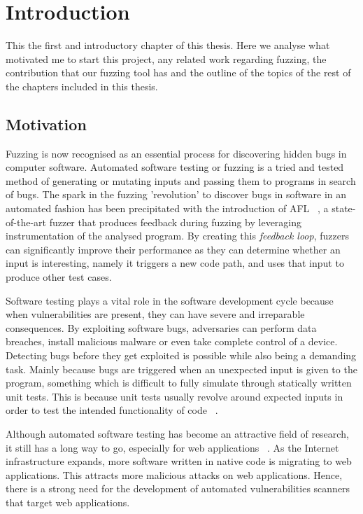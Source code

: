 \chapter{Introduction}
\minitoc
\vspace*{1cm}

This the first and introductory chapter of this thesis. Here we analyse what motivated me to start this project, any related work regarding fuzzing, the contribution that our fuzzing tool has and the outline of the topics of the rest of the chapters included in this thesis.

\section{Motivation}
Fuzzing is now recognised as an essential process for discovering hidden bugs in computer software. Automated software testing or fuzzing is a tried and tested method of generating or mutating inputs and passing them to programs in search of bugs. The spark in the fuzzing 'revolution' to discover bugs in software in an automated fashion has been precipitated with the introduction of AFL ~\cite{zalewski2015american}, a state-of-the-art fuzzer that produces feedback during fuzzing by leveraging instrumentation of the analysed program. By creating this \textit{feedback loop}, fuzzers can significantly improve their performance as they can determine whether an input is interesting, namely it triggers a new code path, and uses that input to produce other test cases.

Software testing plays a vital role in the software development cycle because when vulnerabilities are present, they can have severe and irreparable consequences. By exploiting software bugs, adversaries can perform data breaches, install malicious malware or even take complete control of a device. Detecting bugs before they get exploited is possible while also being a demanding task. Mainly because bugs are triggered when an unexpected input is given to the program, something which is difficult to fully simulate through statically written unit tests. This is because unit tests usually revolve around expected inputs in order to test the intended functionality of code ~\cite{aschermann2019nautilus}.

Although automated software testing has become an attractive field of research, it still has a long way to go, especially for web applications ~\cite{doupe2010johnny}. As the Internet infrastructure expands, more software written in native code is migrating to web applications. This attracts more malicious attacks on web applications. Hence, there is a strong need for the development of automated vulnerabilities scanners that target web applications.
 
